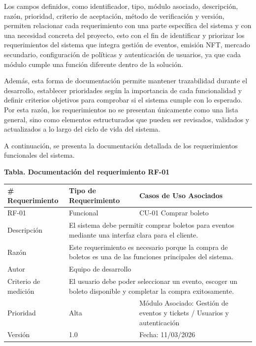 \documentclass[12pt,letterpaper]{article}
\begin{document}
Los campos definidos, como identificador, tipo, módulo asociado, descripción, razón, prioridad, criterio de aceptación, método de verificación y versión, permiten relacionar cada requerimiento con una parte específica del sistema y con una necesidad concreta del proyecto, esto con el fin de identificar y priorizar los requerimientos del sistema que integra gestión de eventos, emisión NFT, mercado secundario, configuración de políticas y autenticación de usuarios, ya que cada módulo cumple una función diferente dentro de la solución.

Además, esta forma de documentación permite mantener trazabilidad durante el desarrollo, establecer prioridades según la importancia de cada funcionalidad y definir criterios objetivos para comprobar si el sistema cumple con lo esperado. Por esta razón, los requerimientos no se presentan únicamente como una lista general, sino como elementos estructurados que pueden ser revisados, validados y actualizados a lo largo del ciclo de vida del sistema.

A continuación, se presenta la documentación detallada de los requerimientos funcionales del sistema. 

\noindent
\begin{minipage}{\textwidth}
\centering
\scriptsize
\renewcommand{\arraystretch}{0.9}
\setlength{\tabcolsep}{3pt}
\setlength{\arrayrulewidth}{0.5pt}

\textbf{Tabla. Documentación del requerimiento RF-01}

\vspace{2pt}

\begin{tabularx}{\textwidth}{|p{2.6cm}|X|p{3.4cm}|}
\hline
\# Requerimiento & Tipo de Requerimiento & Casos de Uso Asociados \\ \hline
RF-01 & Funcional & CU-01 Comprar boleto \\ \hline
Descripción & \multicolumn{2}{X|}{El sistema debe permitir comprar boletos para eventos mediante una interfaz clara para el cliente.} \\ \hline
Razón & \multicolumn{2}{X|}{Este requerimiento es necesario porque la compra de boletos es una de las funciones principales del sistema.} \\ \hline
Autor & \multicolumn{2}{X|}{Equipo de desarrollo} \\ \hline
Criterio de medición & \multicolumn{2}{X|}{El usuario debe poder seleccionar un evento, escoger un boleto disponible y completar la compra exitosamente.} \\ \hline
Prioridad & Alta & Módulo Asociado: Gestión de eventos y tickets / Usuarios y autenticación \\ \hline
Versión & 1.0 & Fecha: 11/03/2026 \\ \hline
\end{tabularx}
\end{minipage}
\end{document}
